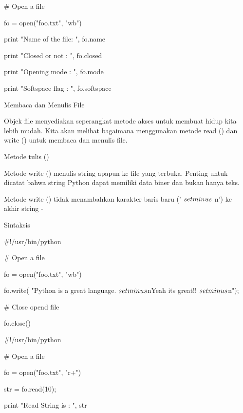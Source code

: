 \vspace{12pt}
 $  \#  $ Open a file \par
fo = open("foo.txt", "wb") \par
print "Name of the file: ", fo.name \par
print "Closed or not : ", fo.closed \par
print "Opening mode : ", fo.mode \par
print "Softspace flag : ", fo.softspace \par
\vspace{12pt}
Membaca dan Menulis File \par
\vspace{12pt}
Objek file menyediakan seperangkat metode akses untuk membuat hidup kita lebih mudah. Kita akan melihat bagaimana menggunakan metode read () dan write () untuk membaca dan menulis file. \par
Metode tulis () \par
\vspace{12pt}
Metode write () menulis string apapun ke file yang terbuka. Penting untuk dicatat bahwa string Python dapat memiliki data biner dan bukan hanya teks. \par
\vspace{12pt}
Metode write () tidak menambahkan karakter baris baru (' $  \\setminus  $ n') ke akhir string - \par
Sintaksis \par
\vspace{12pt}
 $  \#  $!/usr/bin/python \par
\vspace{12pt}
 $  \#  $ Open a file \par
fo = open("foo.txt", "wb") \par
fo.write( "Python is a great language. $  \\setminus  $nYeah its great!! $  \\setminus  $n"); \par
\vspace{12pt}
 $  \#  $ Close opend file \par
fo.close() \par
 $  \#  $!/usr/bin/python \par
\vspace{12pt}
 $  \#  $ Open a file \par
fo = open("foo.txt", "r+") \par
str = fo.read(10); \par
print "Read String is : ", str \par
